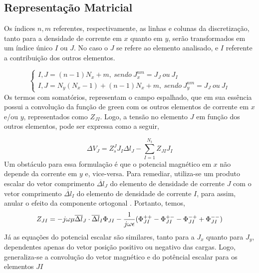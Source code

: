 \documentclass[
	12pt,				%
	openright,			%
	oneside,			%
	a4paper,			%
	english,			%
	brazil				%
	]{abntex2}
\begin{document}
\begin{apendicesenv}
\subsection{Representação Matricial}

Os índices $n,m$ referentes, respectivamente, as linhas e colunas da discretização, tanto para a densidade de corrente em $x$ quanto em $y$, serão transformados em um índice único $I$ ou $J$.  No caso o $J$ se refere ao elemento analisado, e $I$ referente a contribuição dos outros elementos.

\begin{equation}
\begin{cases}
I,J=(n-1) N_x+m ,\ sendo \ J_x^{nm}=J_{J} \ ou \ J_{I}\\
I,J=N_y(N_x-1)+(n-1) N_x+m ,\ sendo \ J_y^{nm}=J_{J} \ ou \ J_{I}
\end{cases}
\end{equation}
Os termos com somatórios, representam o campo espalhado, que em sua essência possui a convolução da função de green com os outros elementos de corrente em $x$ e/ou $y$,  representados como $Z_{JI}$. Logo, a tensão no elemento $J$ em função dos outros elementos, pode ser expressa como a seguir,

\begin{equation}
    {\Delta V}_J=Z^J_s J_I \Delta l_J-  \sum^{N_t}_{I=1}  Z_{JI}J_I
\end{equation}
Um obstáculo para essa formulação é que o potencial magnético em $x$ não depende da corrente em $y$ e, vice-versa. Para remediar, utiliza-se um produto escalar do vetor comprimento  $\overline{\Delta l}_J$  do elemento de densidade de corrente $J$ com o vetor comprimento $\overline{\Delta l}_I$ do elemento de densidade de corrente $I$, para assim, anular o efeito da componente ortogonal . Portanto, temos,
\begin{equation}
   Z_{JI}=-   
j\omega \mu  \overline{\Delta l}_J \cdot \overline{\Delta l}_I  \Phi_{JI}\\ 
 -
    \frac{1}{j \omega \epsilon}  (\Phi_{JI}^{++}-\Phi_{JI}^{+-}-\Phi_{JI}^{-+}+\Phi_{JI}^{--}) \\
\end{equation}
Já as equações do potencial escalar são similares, tanto para a $J_x$ quanto para $J_y$, dependentes apenas do vetor posição positivo ou negativo das cargas. Logo, generaliza-se a convolução do vetor magnético e do potêncial escalar para os elementos $JI$


\end{apendicesenv}
\end{document}
